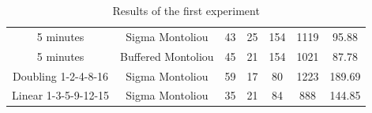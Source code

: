 \documentclass[compress,9pt,xcolor={dvipsnames,table}]{beamer}
\begin{document}
\begin{frame}[t]
\begin{table}[t]
{\begin{tabular}{@{}ccccccc@{}}
5 minutes & Sigma Montoliou     & 43 & 25 & 154 & 1119 & 95.88 \\
5 minutes & Buffered Montoliou  & 45 & 21 & 154 & 1021 & 87.78 \\
\cmidrule{1-7}

Doubling 1-2-4-8-16 & Sigma Montoliou   & 59 & 17 & 80 & 1223 & 189.69 \\
Linear 1-3-5-9-12-15 &  Sigma Montoliou & 35 & 21 & 84 & 888 & 144.85 \\

\bottomrule
\end{tabular}
}
\caption{Results of the first experiment}
\label{tbl:experiment-1}
\end{table}
\end{frame}


\end{document}
